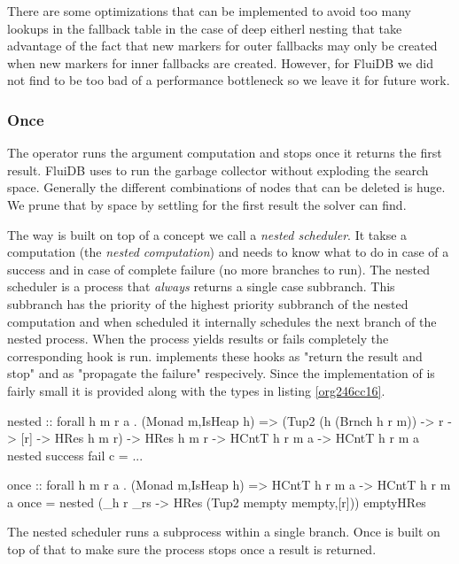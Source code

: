 There are some optimizations that can be implemented to avoid too many
lookups in the fallback table in the case of deep eitherl nesting that
take advantage of the fact that new markers for outer fallbacks may
only be created when new markers for inner fallbacks are
created. However, for FluiDB we did not find  to be too bad of a
performance bottleneck so we leave it for future work.


\subsubsection{Once}
\label{sec:orgf87066e}
The  operator runs the argument computation and stops once it
returns the first result. FluiDB uses  to run the garbage
collector without exploding the search space. Generally the different
combinations of nodes that can be deleted is huge. We prune that by
space by settling for the first result the solver can find.

The way  is built on top of a concept we call a \emph{nested
scheduler}. It takse a computation (the \emph{nested computation}) and
needs to know what to do in case of a success and in case of complete
failure (no more branches to run). The nested scheduler is a process
that \emph{always} returns a single case subbranch. This subbranch has the
priority of the highest priority subbranch of the nested computation
and when scheduled it internally schedules the next branch of the
nested process. When the process yields results or fails completely
the corresponding hook is run.  implements these hooks as
"return the result and stop" and as "propagate the failure"
respecively. Since the implementation of  is fairly small it is
provided along with the types in listing \ref{org246cc16}.

\begin{code}
\begin{haskellcode}
nested
  :: forall h m r a .
  (Monad m,IsHeap h)
  => (Tup2 (h (Brnch h r m)) -> r -> [r] -> HRes h m r)
  -> HRes h m r
  -> HCntT h r m a
  -> HCntT h r m a
nested success fail c = ...

once :: forall h m r a . (Monad m,IsHeap h) => HCntT h r m a -> HCntT h r m a
once = nested (\_h r _rs -> HRes (Tup2 mempty mempty,[r])) emptyHRes
\end{haskellcode}
\caption{\label{org246cc16}The nested scheduler runs a subprocess within a single branch. Once is built on top of that to make sure the process stops once a result is returned.}
\end{code}


